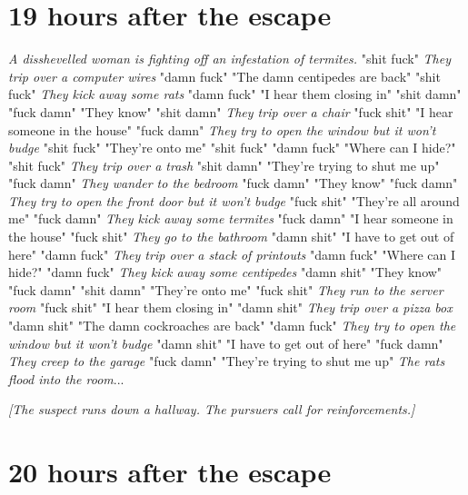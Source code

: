 \documentclass{report}
\begin{document}
\section*{19 \small{hours after the escape}}

\textit{A disshevelled woman is fighting off an infestation of termites.} "shit fuck" \textit{They trip over a computer wires} "damn fuck" "The damn centipedes are back" "shit fuck" \textit{They kick away some rats} "damn fuck" "I hear them closing in" "shit damn" \textit{} "fuck damn" "They know" "shit damn" \textit{They trip over a chair} "fuck shit" "I hear someone in the house" "fuck damn" \textit{They try to open the window but it won't budge} "shit fuck" "They're onto me" "shit fuck" \textit{} "damn fuck" "Where can I hide?" "shit fuck" \textit{They trip over a trash} "shit damn" "They're trying to shut me up" "fuck damn" \textit{They wander to the bedroom} "fuck damn" "They know" "fuck damn" \textit{They try to open the front door but it won't budge} "fuck shit" "They're all around me" "fuck damn" \textit{They kick away some termites} "fuck damn" "I hear someone in the house" "fuck shit" \textit{They go to the bathroom} "damn shit" "I have to get out of here" "damn fuck" \textit{They trip over a stack of printouts} "damn fuck" "Where can I hide?" "damn fuck" \textit{They kick away some centipedes} "damn shit" "They know" "fuck damn" \textit{} "shit damn" "They're onto me" "fuck shit" \textit{They run to the server room} "fuck shit" "I hear them closing in" "damn shit" \textit{They trip over a pizza box} "damn shit" "The damn cockroaches are back" "damn fuck" \textit{They try to open the window but it won't budge} "damn shit" "I have to get out of here" "fuck damn" \textit{They creep to the garage} "fuck damn" "They're trying to shut me up" \textit{The rats flood into the room}...

\textit{[The suspect runs down a hallway. The pursuers call for reinforcements.]}


\section*{20 \small{hours after the escape}}
\end{document}
